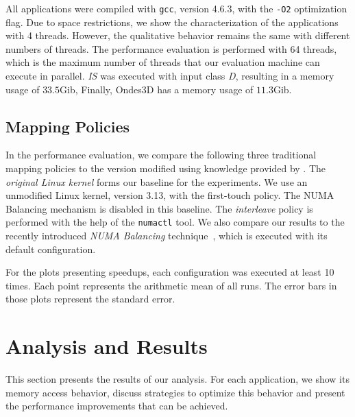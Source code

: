 All applications were compiled with \texttt{gcc}, version 4.6.3, with the \texttt{-O2} optimization flag.
Due to space restrictions, we show the characterization of the applications
with 4 threads. However, the qualitative behavior remains the same with different numbers of threads. The performance evaluation is performed with 64 threads,
which is the maximum number of threads that our evaluation machine can execute
in parallel. %
\emph{IS} was executed
with input class \emph{D}, resulting in a memory usage of $33.5$Gib, Finally, Ondes3D has a memory usage of $11.3$Gib.

\subsection{Mapping Policies}

In the performance evaluation, we compare the following three traditional
mapping policies to the version modified using knowledge provided by \TABARNAC.
The \emph{original Linux kernel} forms our baseline for the experiments. We use an unmodified Linux kernel, version 3.13, with the first-touch policy. The NUMA Balancing mechanism is disabled in this baseline.
The \emph{interleave} policy is performed with the help of the \texttt{numactl} tool.
We also compare our results to the recently introduced \emph{NUMA Balancing} technique~\cite{Corbet}, which is executed with its default configuration.

For the plots presenting speedups, each configuration was executed at least 10 times. Each point represents the arithmetic mean of all runs.
The error bars in those plots represent the standard error.


\section{Analysis and Results}
\label{sec:expe-analysis}

This section presents the results of our analysis.
For each application, we show its memory access behavior, discuss strategies to optimize this behavior and present the performance improvements that can be achieved.



